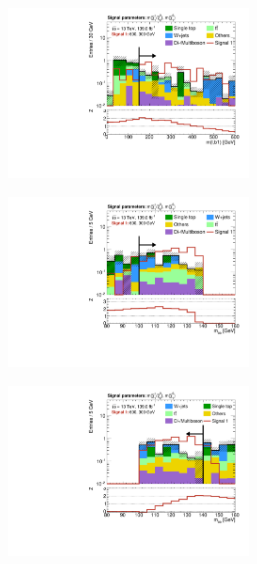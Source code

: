 \begin{figure}
\begin{subfigure}[b]{0.5\linewidth}
		\caption{}
	\end{subfigure}\hfill
	\begin{subfigure}[b]{0.5\linewidth}
		\centering\includegraphics[width=0.7\textwidth]{N-1_cut_scan/n1_600_300/mlb1}
		\caption{}
	\end{subfigure}\hfill
	\begin{subfigure}[b]{0.5\linewidth}
		\centering\includegraphics[width=0.7\textwidth]{N-1_cut_scan/n1_600_300/mbb_lower}
		\caption{}
	\end{subfigure}\hfill
	\begin{subfigure}[b]{0.5\linewidth}
		\centering\includegraphics[width=0.7\textwidth]{N-1_cut_scan/n1_600_300/mbb_upper}

\end{subfigure}
\end{figure}
